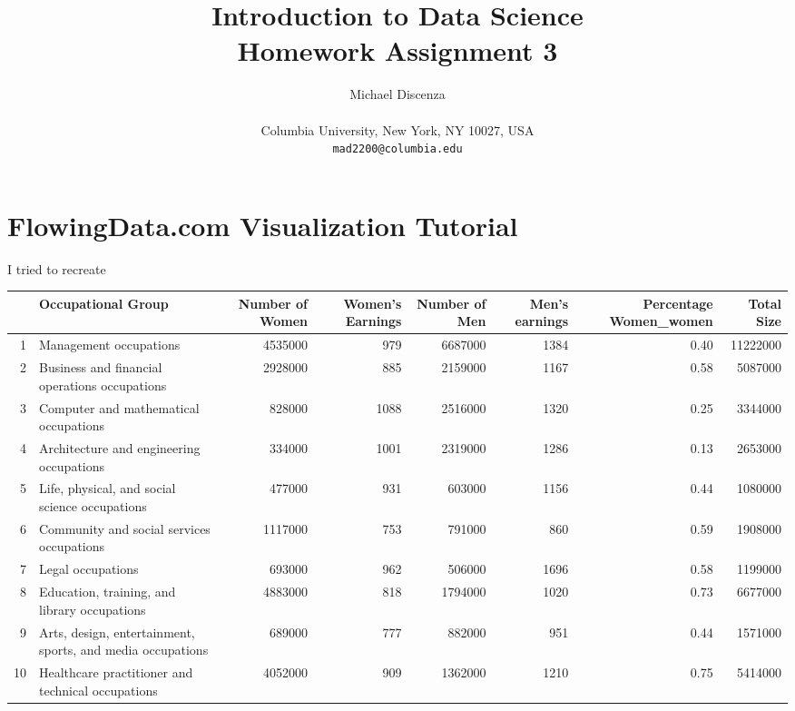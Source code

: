 \documentclass{article}
\title{Introduction to Data Science\\Homework Assignment 3}
\author{
Michael Discenza\\\\
Columbia University, New York, NY 10027, USA \\
\texttt{mad2200@columbia.edu}
}
\begin{document}
\maketitle




\section{FlowingData.com Visualization Tutorial}

I tried to recreate 


\begin{table}[ht]
\begin{center}
\begin{tabular}{rlrrrrrr}
  \hline
 & Occupational Group & Number of Women & Women's Earnings & Number of Men & Men's earnings & Percentage Women\_women & Total Size\\ 
  \hline
1 &   Management occupations & 4535000 & 979 & 6687000 & 1384 & 0.40 & 11222000 \\ 
  2 &   Business and financial operations occupations & 2928000 & 885 & 2159000 & 1167 & 0.58 & 5087000 \\ 
  3 &   Computer and mathematical occupations & 828000 & 1088 & 2516000 & 1320 & 0.25 & 3344000 \\ 
  4 &   Architecture and engineering occupations & 334000 & 1001 & 2319000 & 1286 & 0.13 & 2653000 \\ 
  5 &   Life, physical, and social science occupations & 477000 & 931 & 603000 & 1156 & 0.44 & 1080000 \\ 
  6 &   Community and social services occupations & 1117000 & 753 & 791000 & 860 & 0.59 & 1908000 \\ 
  7 &   Legal occupations & 693000 & 962 & 506000 & 1696 & 0.58 & 1199000 \\ 
  8 &   Education, training, and library occupations & 4883000 & 818 & 1794000 & 1020 & 0.73 & 6677000 \\ 
  9 &   Arts, design, entertainment, sports, and media occupations & 689000 & 777 & 882000 & 951 & 0.44 & 1571000 \\ 
  10 &  Healthcare practitioner and technical occupations & 4052000 & 909 & 1362000 & 1210 & 0.75 & 5414000 \\ 
   \hline
\end{tabular}
\end{center}
\end{table}
\end{document}
